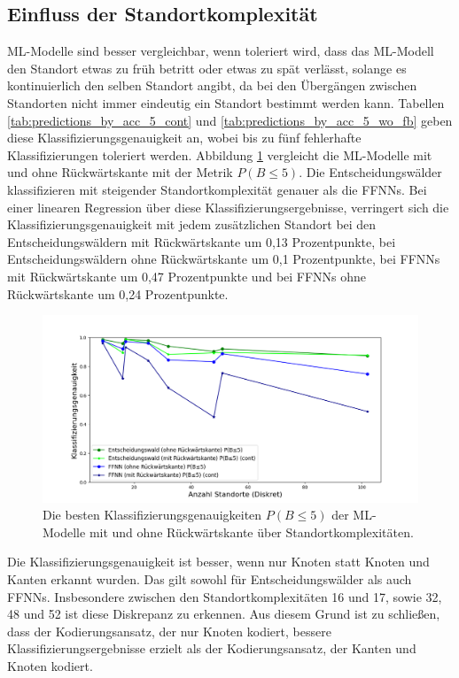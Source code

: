 \subsection{Einfluss der Standortkomplexität}
ML-Modelle sind besser vergleichbar, wenn toleriert wird, dass das ML-Modell den Standort etwas zu früh betritt oder etwas zu spät verlässt,
solange es kontinuierlich den selben Standort angibt, da bei den Übergängen zwischen Standorten nicht immer eindeutig ein Standort bestimmt werden kann.
Tabellen \ref{tab:predictions_by_acc_5_cont} und \ref{tab:predictions_by_acc_5_wo_fb} geben diese Klassifizierungsgenauigkeit an,
wobei bis zu fünf fehlerhafte Klassifizierungen toleriert werden.
\newline
\newline
Abbildung \ref{fig:best_dt_vs_knn_pb_5_vs_pb_5_cont} vergleicht die ML-Modelle mit und ohne Rückwärtskante mit der Metrik $P(B\leq5)$.
Die Entscheidungswälder klassifizieren mit steigender Standortkomplexität genauer als die FFNNs.
Bei einer linearen Regression über diese Klassifizierungsergebnisse,
verringert sich die Klassifizierungsgenauigkeit mit jedem zusätzlichen Standort bei den Entscheidungswäldern mit Rückwärtskante um 0,13 Prozentpunkte,
bei Entscheidungswäldern ohne Rückwärtskante um 0,1 Prozentpunkte,
bei FFNNs mit Rückwärtskante um 0,47 Prozentpunkte und bei FFNNs ohne Rückwärtskante um 0,24 Prozentpunkte.
\begin{figure}[h!]
    \centering
    \includegraphics[width=\linewidth]{images/best_dt_vs_knn_pb_5_vs_pb_5_cont.png}
    \caption{Die besten Klassifizierungsgenauigkeiten $P(B\leq5)$ der ML-Modelle mit und ohne Rückwärtskante über Standortkomplexitäten.}
    \label{fig:best_dt_vs_knn_pb_5_vs_pb_5_cont}
\end{figure}
\newline
\newline
Die Klassifizierungsgenauigkeit ist besser, wenn nur Knoten statt Knoten und Kanten erkannt wurden.
Das gilt sowohl für Entscheidungswälder als auch FFNNs.
Insbesondere zwischen den Standortkomplexitäten 16 und 17, sowie 32, 48 und 52 ist diese Diskrepanz zu erkennen.
Aus diesem Grund ist zu schließen, dass der Kodierungsansatz, der nur Knoten kodiert,
bessere Klassifizierungsergebnisse erzielt als der Kodierungsansatz, der Kanten und Knoten kodiert.

